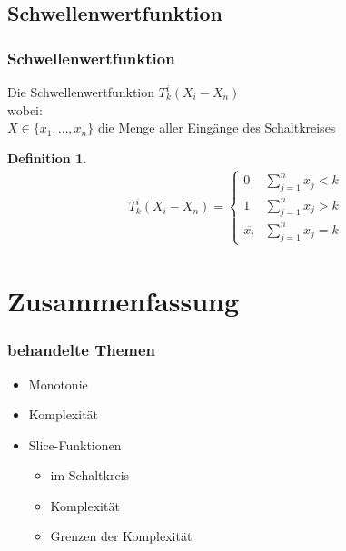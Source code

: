 \documentclass[hyperref={pdfpagelabels=false}]{beamer} %
\newtheorem{defin}{Definition}
\begin{document}
  \subsection*{Schwellenwertfunktion}
  \begin{frame}%
     \frametitle{Schwellenwertfunktion}
     Die Schwellenwertfunktion $ T^{i}_k(X_i - X_n)$\\
     wobei: \\
     $X \in \{x_1, \dots,x_n\}$ die Menge aller Eingänge des Schaltkreises
     \begin{defin}
       \begin{align*}
       T^{i}_k (X_i - X_n)=
       \begin{cases}
         0 & \sum\nolimits_{j=1}^{n} x_j < k\\
         1 & \sum\nolimits_{j=1}^{n} x_j > k\\
         \overline{x_i} & \sum\nolimits_{j=1}^{n} x_j = k
        \end{cases}
       \end{align*}
      \end{defin}
  \end{frame}

  \section{Zusammenfassung}
  \begin{frame}
    \frametitle{behandelte Themen}
    \begin{itemize}
      \item Monotonie
      \item Komplexität
      \item Slice-Funktionen
      \begin{itemize}
        \item im Schaltkreis
        \item Komplexität
        \item Grenzen der Komplexität
      \end{itemize}
    \end{itemize}
  \end{frame}
\end{document}
